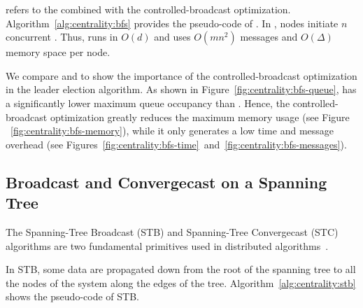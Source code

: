 \cheungIeCb{} refers to the \cheungIe{} combined with the controlled-broadcast optimization. Algorithm~\ref{alg:centrality:bfs} provides the pseudo-code of \cheungIeCb{}. In \cheungIeCb{}, nodes initiate $n$ concurrent \cheungCb{}. Thus, \cheungIeCb{} runs in $O(d)$ and uses $O(mn^2)$ messages and $O(\Delta)$ memory space per node.

We compare \cheungIe{} and \cheungIeCb{} to show the importance of the controlled-broadcast optimization in the leader election algorithm. As shown in Figure~\ref{fig:centrality:bfs-queue}, \cheungIeCb{} has a significantly lower maximum queue occupancy than \cheungIe{}. Hence, the controlled-broadcast optimization greatly reduces the maximum memory usage (see Figure ~\ref{fig:centrality:bfs-memory}), while it only generates a low time and message overhead (see Figures~\ref{fig:centrality:bfs-time}~and~\ref{fig:centrality:bfs-messages}).

\subsection{Broadcast and Convergecast on a Spanning Tree}
\label{section:centrality:stb-stc}

The Spanning-Tree Broadcast (STB) and Spanning-Tree Convergecast (STC) algorithms are two fundamental primitives used in distributed algorithms~\cite{lynch1996distributed,raynal2013distributed}.

In STB, some data are propagated down from the root of the spanning tree to all the nodes of the system along the edges of the tree. Algorithm~\ref{alg:centrality:stb} shows the pseudo-code of STB.

\newcommand{\STBSTCOnly}[1]{\textcolor{gray}{$\llcorner$#1$\urcorner$}~}

